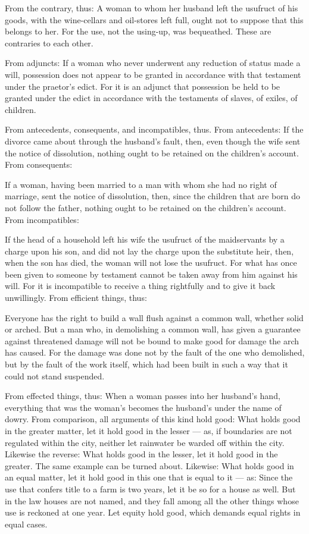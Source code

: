  From the contrary, thus: A woman to whom her husband left the usufruct of his goods, with the wine-cellars and oil-stores left full, ought not to suppose that this belongs to her. For the use, not the using-up, was bequeathed. These are contraries to each other.

 From adjuncts: If a woman who never underwent any reduction of status made a will, possession does not appear to be granted in accordance with that testament under the praetor's edict. For it is an adjunct that possession be held to be granted under the edict in accordance with the testaments of slaves, of exiles, of children.

 From antecedents, consequents, and incompatibles, thus. From antecedents: If the divorce came about through the husband's fault, then, even though the wife sent the notice of dissolution, nothing ought to be retained on the children's account. From consequents:

 If a woman, having been married to a man with whom she had no right of marriage, sent the notice of dissolution, then, since the children that are born do not follow the father, nothing ought to be retained on the children's account. From incompatibles:

 If the head of a household left his wife the usufruct of the maidservants by a charge upon his son, and did not lay the charge upon the substitute heir, then, when the son has died, the woman will not lose the usufruct. For what has once been given to someone by testament cannot be taken away from him against his will. For it is incompatible to receive a thing rightfully and to give it back unwillingly. From efficient things, thus:

 Everyone has the right to build a wall flush against a common wall, whether solid or arched. But a man who, in demolishing a common wall, has given a guarantee against threatened damage will not be bound to make good for damage the arch has caused. For the damage was done not by the fault of the one who demolished, but by the fault of the work itself, which had been built in such a way that it could not stand suspended.

 From effected things, thus: When a woman passes into her husband's hand, everything that was the woman's becomes the husband's under the name of dowry. From comparison, all arguments of this kind hold good: What holds good in the greater matter, let it hold good in the lesser — as, if boundaries are not regulated within the city, neither let rainwater be warded off within the city. Likewise the reverse: What holds good in the lesser, let it hold good in the greater. The same example can be turned about. Likewise: What holds good in an equal matter, let it hold good in this one that is equal to it — as: Since the use that confers title to a farm is two years, let it be so for a house as well. But in the law houses are not named, and they fall among all the other things whose use is reckoned at one year. Let equity hold good, which demands equal rights in equal cases.

